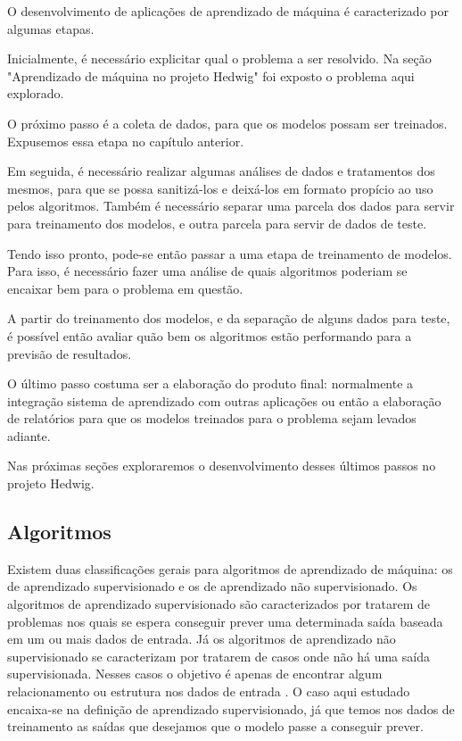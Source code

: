 			O desenvolvimento de aplicações de aprendizado de máquina é caracterizado por algumas etapas.

			Inicialmente, é necessário explicitar qual o problema a ser resolvido. Na seção "Aprendizado de máquina no projeto Hedwig" foi exposto o problema aqui explorado.

			O próximo passo é a coleta de dados, para que os modelos possam ser treinados. Expusemos essa etapa no capítulo anterior.

			Em seguida, é necessário realizar algumas análises de dados e tratamentos dos mesmos, para que se possa sanitizá-los e deixá-los em formato propício ao uso pelos algoritmos. Também é necessário separar uma parcela dos dados para servir para treinamento dos modelos, e outra parcela para servir de dados de teste.

			Tendo isso pronto, pode-se então passar a uma etapa de treinamento de modelos. Para isso, é necessário fazer uma análise de quais algoritmos poderiam se encaixar bem para o problema em questão.

			A partir do treinamento dos modelos, e da separação de alguns dados para teste, é possível então avaliar quão bem os algoritmos estão performando para a previsão de resultados.

			O último passo costuma ser a elaboração do produto final: normalmente a integração sistema de aprendizado com outras aplicações ou então a elaboração de relatórios para que os modelos treinados para o problema sejam levados adiante.

			Nas próximas seções exploraremos o desenvolvimento desses últimos passos no projeto Hedwig.

		\subsection{Algoritmos}

				Existem duas classificações gerais para algoritmos de aprendizado de máquina: os de aprendizado supervisionado e os de aprendizado não supervisionado. Os algoritmos de aprendizado supervisionado são caracterizados por tratarem de problemas nos quais se espera conseguir prever uma determinada saída baseada em um ou mais dados de entrada. Já os algoritmos de aprendizado não supervisionado se caracterizam por tratarem de casos onde não há uma saída supervisionada. Nesses casos o objetivo é apenas de encontrar algum relacionamento ou estrutura nos dados de entrada \cite{islr}. O caso aqui estudado encaixa-se na definição de aprendizado supervisionado, já que temos nos dados de treinamento as saídas que desejamos que o modelo passe a conseguir prever.

